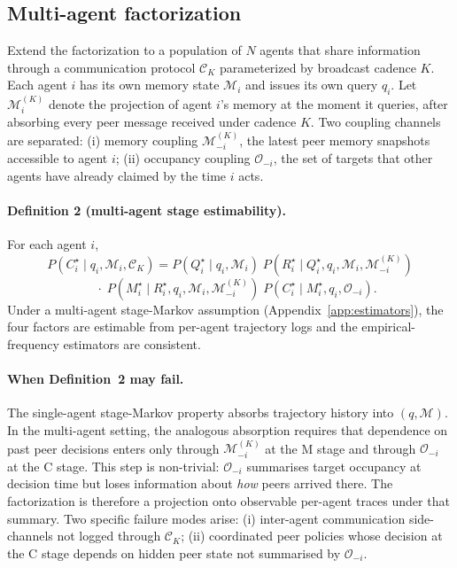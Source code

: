 \documentclass{article}
\begin{document}
\subsection{Multi-agent factorization}
\label{sec:multi-theory}

Extend the factorization to a population of $N$ agents that share
information through a communication protocol $\mathcal{C}_K$
parameterized by broadcast cadence $K$. Each agent $i$ has its own
memory state $\mathcal{M}_i$ and issues its own query $q_i$. Let
$\mathcal{M}_i^{(K)}$ denote the projection of agent $i$'s memory at
the moment it queries, after absorbing every peer message received
under cadence $K$. Two coupling channels are separated: (i) memory
coupling $\mathcal{M}_{-i}^{(K)}$, the latest peer memory snapshots
accessible to agent $i$; (ii) occupancy coupling $\mathcal{O}_{-i}$,
the set of targets that other agents have already claimed by the time
$i$ acts.

\paragraph{Definition 2 (multi-agent stage estimability).}
For each agent $i$,
\[
P(C^\star_i \mid q_i, \mathcal{M}_i, \mathcal{C}_K)
=
P(Q^\star_i \mid q_i, \mathcal{M}_i)\;
P(R^\star_i \mid Q^\star_i, q_i, \mathcal{M}_i, \mathcal{M}_{-i}^{(K)})
\]
\[
\quad \cdot\;
P(M^\star_i \mid R^\star_i, q_i, \mathcal{M}_i, \mathcal{M}_{-i}^{(K)})\;
P(C^\star_i \mid M^\star_i, q_i, \mathcal{O}_{-i}).
\]
Under a multi-agent stage-Markov assumption
(Appendix~\ref{app:estimators}), the four factors are estimable from
per-agent trajectory logs and the empirical-frequency estimators are
consistent.

\paragraph{When Definition~2 may fail.}
The single-agent stage-Markov property absorbs trajectory history into
$(q, \mathcal{M})$. In the multi-agent setting, the analogous
absorption requires that dependence on past peer decisions enters only
through $\mathcal{M}_{-i}^{(K)}$ at the M stage and through
$\mathcal{O}_{-i}$ at the C stage. This step is non-trivial:
$\mathcal{O}_{-i}$ summarises target occupancy at decision time but
loses information about \emph{how} peers arrived there. The
factorization is therefore a projection onto observable per-agent
traces under that summary. Two specific failure modes arise: (i)
inter-agent communication side-channels not logged through
$\mathcal{C}_K$; (ii) coordinated peer policies whose decision at the
C stage depends on hidden peer state not summarised by
$\mathcal{O}_{-i}$.
\end{document}
